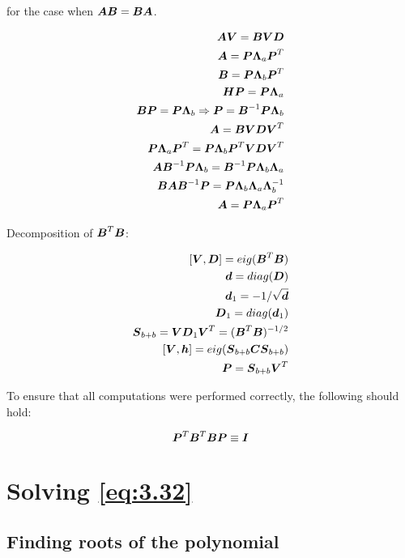 for the case when $\BA\BB = \BB\BA$.

\begin{eqnarray}
\nonumber
\BA\BV = \BB\BV\BD \\
\nonumber
\BA = \BP\BLambda_a\BP^T \\
\nonumber
\BB = \BP\BLambda_b\BP^T \\
\nonumber
\BH\BP = \BP\BLambda_a \\
\nonumber
\BB\BP = \BP\BLambda_b \Rightarrow \BP = \BB^{-1}\BP\BLambda_b \\
\nonumber
\BA = \BB\BV\BD\BV^T \\
\nonumber
\BP\BLambda_a\BP^T = \BP\BLambda_b\BP^T\BV\BD\BV^T \\
\nonumber
\BA\BB^{-1}\BP\BLambda_b = \BB^{-1}\BP\BLambda_b\BLambda_a \\
\nonumber
\BB\BA\BB^{-1}\BP = \BP\BLambda_b\BLambda_a\BLambda_b^{-1} \\
\nonumber
\BA = \BP\BLambda_a\BP^T
\end{eqnarray}

Decomposition of $\BB^T\BB$:

\begin{eqnarray}
\nonumber
[\BV, \BD] = eig(\BB^T\BB) \\
\nonumber
\Bd = diag(\BD) \\
\nonumber
\Bd_1 = -1/\sqrt{\Bd} \\
\nonumber
\BD_1 = diag(\Bd_1) \\
\nonumber
\BS_{b+b} = \BV\BD_1\BV^T = (\BB^T\BB)^{-1/2} \\
\nonumber
[\BV, \Bh] = eig(\BS_{b+b}\BC\BS_{b+b}) \\
\nonumber
\BP = \BS_{b+b}\BV^T
\end{eqnarray}

To ensure that all computations were performed correctly,
the following should hold:

\begin{equation}
\BP^T\BB^T\BB\BP \equiv \BI
\end{equation}

\section{Solving \ref{eq:3.32}}

\subsection{Finding roots of the polynomial}

